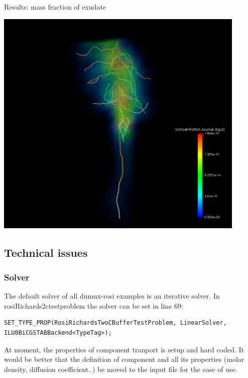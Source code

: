 

Results: mass fraction of exudate

\noindent\begin{minipage}[c]{1\columnwidth}%
\includegraphics[width=0.9\textwidth]{example_exudates.jpg}%
\end{minipage}

\subsection*{Technical issues}

\subsubsection*{Solver}

The default solver of all dumux-rosi examples is an iterative solver.
In rosiRichards2ctestproblem the solver can be set in line 69:
\begin{lstlisting}
SET_TYPE_PROP(RosiRichardsTwoCBufferTestProblem, LinearSolver, ILU0BiCGSTABBackend<TypeTag>);
\end{lstlisting}

At moment, the properties of component tranport is setup and hard
coded. It would be better that the definition of component and all
its properties (molar density, diffusion coefficient..) be moved to
the input file for the ease of use.

